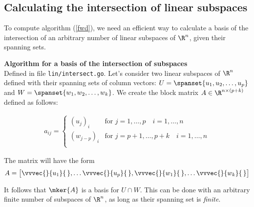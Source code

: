 \subsection{Calculating the intersection of linear subspaces}

To compute algorithm (\ref{fwd}), we need an efficient way to calculate a basis 
of the intersection of an arbitrary number of linear subspaces of $\R^n$, given their 
spanning sets. 

\begin{defn}
  \textbf{Algorithm for a basis of the intersection of subspaces} \\
  Defined in file \texttt{lin/intersect.go}.
  Let's consider two linear subspaces of 
  $\R^n$ defined with their spanning sets of column vectors: 
  $U = \spanset{u_1, u_2, \hdots, u_p}$ 
  and $W = \spanset{w_1, w_2, \hdots, w_k}$.
  We create the block matrix $A \in \R^{n \times (p+k)}$ defined as follows:
  
  \begin{equation*}
    \begin{aligned}
      a_{ij} = \begin{cases}
        (u_j)_i & \text{for  } j = 1, \hdots, p \quad i = 1, \hdots, n \\
        (w_{j-p})_i & \text{for  } j = p+1, \hdots, p+k \quad i = 1, \hdots, n \\
      \end{cases}
    \end{aligned}
  \end{equation*}
  
  The matrix will have the form
  \begin{equation*}
    A = \begin{bmatrix}
      \vvvec{}{u_1}{\,}, \hdots \vvvec{}{u_p}{\,}, 
      \vvvec{}{w_1}{\,}, \hdots \vvvec{}{w_k}{\,} 
    \end{bmatrix}
  \end{equation*}

  It follows that $\mker{A}$ is a basis for $U \cap W$. This can be done with an 
  arbitrary finite number of subspaces of $\R^n$, as long as their spanning set is 
  \textit{finite}.
\end{defn}

